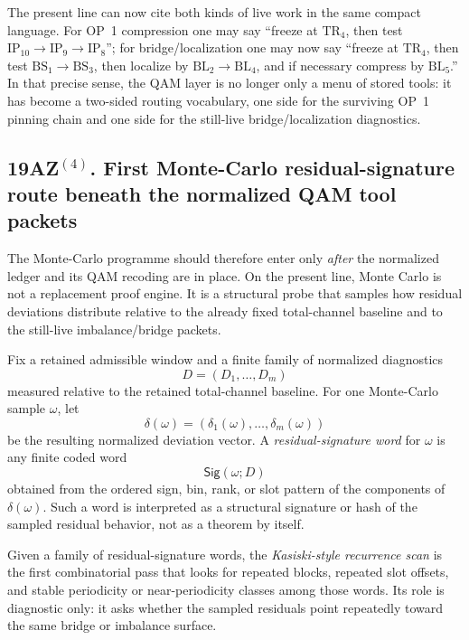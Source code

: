 \begin{remark}
\label{rem:what-the-second-practical-tag-rewrite-buys}
The present line can now cite both kinds of live work in the same compact language. For OP~1 compression one may say ``freeze at \(\mathrm{TR}_4\), then test \(\mathrm{IP}_{10}\to\mathrm{IP}_9\to\mathrm{IP}_8\)''; for bridge/localization one may now say ``freeze at \(\mathrm{TR}_4\), then test \(\mathrm{BS}_1\to\mathrm{BS}_3\), then localize by \(\mathrm{BL}_2\to\mathrm{BL}_4\), and if necessary compress by \(\mathrm{BL}_5\).'' In that precise sense, the QAM layer is no longer only a menu of stored tools: it has become a two-sided routing vocabulary, one side for the surviving OP~1 pinning chain and one side for the still-live bridge/localization diagnostics.
\end{remark}

\subsection*{19AZ$^{(4)}$. First Monte-Carlo residual-signature route beneath the normalized QAM tool packets}
\label{sec:first-monte-carlo-residual-signature-route}
The Monte-Carlo programme should therefore enter only \emph{after} the normalized ledger and its QAM recoding are in place. On the present line, Monte Carlo is not a replacement proof engine. It is a structural probe that samples how residual deviations distribute relative to the already fixed total-channel baseline and to the still-live imbalance/bridge packets.

\begin{definition}
\label{def:residual-signature-word}
Fix a retained admissible window and a finite family of normalized diagnostics
\[
D=(D_1,\dots,D_m)
\]
measured relative to the retained total-channel baseline. For one Monte-Carlo sample \(\omega\), let
\[
\delta(\omega)=(\delta_1(\omega),\dots,\delta_m(\omega))
\]
be the resulting normalized deviation vector. A \emph{residual-signature word} for \(\omega\) is any finite coded word
\[
\mathsf{Sig}(\omega;D)
\]
obtained from the ordered sign, bin, rank, or slot pattern of the components of \(\delta(\omega)\). Such a word is interpreted as a structural signature or hash of the sampled residual behavior, not as a theorem by itself.
\end{definition}

\begin{definition}
\label{def:kasiski-style-recurrence-scan}
Given a family of residual-signature words, the \emph{Kasiski-style recurrence scan} is the first combinatorial pass that looks for repeated blocks, repeated slot offsets, and stable periodicity or near-periodicity classes among those words. Its role is diagnostic only: it asks whether the sampled residuals point repeatedly toward the same bridge or imbalance surface.
\end{definition}

